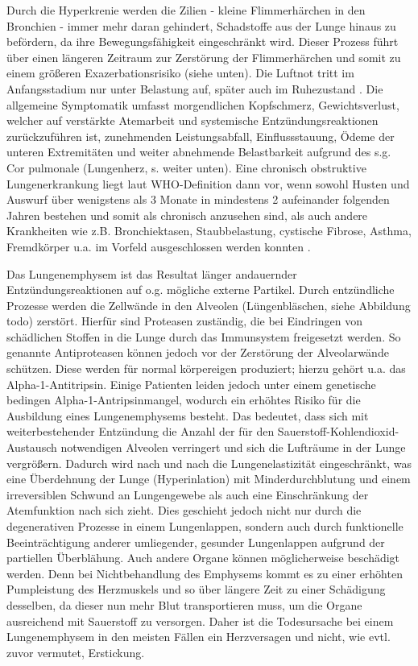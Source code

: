 Durch die Hyperkrenie werden die Zilien - kleine Flimmerhärchen in den Bronchien - immer mehr daran gehindert, Schadstoffe aus der Lunge hinaus zu befördern, da ihre Bewegungsfähigkeit eingeschränkt wird. Dieser Prozess führt über einen längeren Zeitraum zur Zerstörung der Flimmerhärchen und somit zu einem größeren Exazerbationsrisiko (siehe unten).
Die Luftnot tritt im Anfangsstadium nur unter Belastung auf, später auch im Ruhezustand \autocite[vgl.][6f.]{lorenz2009}. Die allgemeine Symptomatik umfasst morgendlichen Kopfschmerz, Gewichtsverlust, welcher auf verstärkte Atemarbeit und systemische Entzündungsreaktionen zurückzuführen ist, zunehmenden Leistungsabfall, Einflussstauung, Ödeme der unteren Extremitäten und weiter abnehmende Belastbarkeit aufgrund des s.g. Cor pulmonale (Lungenherz, s. weiter unten).
Eine chronisch obstruktive Lungenerkrankung liegt laut WHO-Definition dann vor, wenn sowohl Husten und Auswurf über wenigstens als 3 Monate in mindestens 2 aufeinander folgenden Jahren bestehen und somit als chronisch anzusehen sind, als auch andere Krankheiten wie z.B. Bronchiektasen, Staubbelastung, cystische Fibrose, Asthma, Fremdkörper u.a. im Vorfeld ausgeschlossen werden konnten \autocite[vgl.][71]{koehler2010}. 


Das Lungenemphysem ist das Resultat länger andauernder Entzündungsreaktionen auf o.g. mögliche externe Partikel. Durch entzündliche Prozesse  werden die Zellwände in den Alveolen  (Lüngenbläschen, siehe Abbildung todo) zerstört. Hierfür sind Proteasen zuständig, die bei Eindringen von schädlichen Stoffen in die Lunge durch das Immunsystem freigesetzt werden. So genannte Antiproteasen können jedoch vor der Zerstörung der Alveolarwände schützen. Diese werden für normal körpereigen produziert; hierzu gehört u.a. das Alpha-1-Antitripsin. Einige Patienten leiden jedoch unter einem genetische bedingen Alpha-1-Antripsinmangel, wodurch ein erhöhtes Risiko für die Ausbildung eines Lungenemphysems besteht.
Das bedeutet, dass sich mit weiterbestehender Entzündung die Anzahl der für den Sauerstoff-Kohlendioxid-Austausch notwendigen Alveolen verringert und sich die Lufträume in der Lunge vergrößern. Dadurch wird nach und nach die Lungenelastizität eingeschränkt, was eine Überdehnung der Lunge (Hyperinlation) mit Minderdurchblutung und einem irreversiblen Schwund an Lungengewebe als auch eine Einschränkung der Atemfunktion nach sich zieht. Dies geschieht jedoch nicht nur durch die degenerativen Prozesse in einem Lungenlappen, sondern auch durch funktionelle Beeinträchtigung anderer umliegender, gesunder Lungenlappen aufgrund der partiellen Überblähung. Auch andere Organe können möglicherweise beschädigt werden. Denn bei Nichtbehandlung des Emphysems kommt es zu einer erhöhten Pumpleistung des Herzmuskels und so über längere Zeit zu einer Schädigung desselben, da dieser nun mehr Blut transportieren muss, um die Organe ausreichend mit Sauerstoff zu versorgen. Daher ist die Todesursache bei einem Lungenemphysem in den meisten Fällen ein Herzversagen und nicht, wie evtl. zuvor vermutet, Erstickung.

